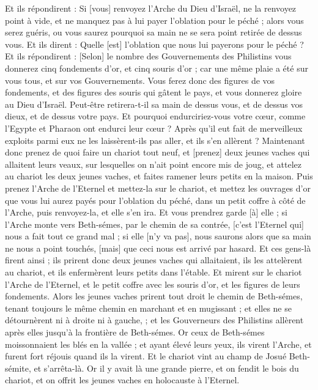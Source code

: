 \begin{multicols}{2}
Et ils répondirent : Si [vous] renvoyez l'Arche du Dieu d'Israël, ne la renvoyez point à vide, et ne manquez pas à lui payer l'oblation pour le péché ; alors vous serez guéris, ou vous saurez pourquoi sa main ne se sera point retirée de dessus vous.
Et ils dirent : Quelle [est] l'oblation que nous lui payerons pour le péché ? Et ils répondirent : [Selon] le nombre des Gouvernements des Philistins vous donnerez cinq fondements d'or, et cinq souris d'or ; car une même plaie a été sur vous tous, et sur vos Gouvernements.
Vous ferez donc des figures de vos fondements, et des figures des souris qui gâtent le pays, et vous donnerez gloire au Dieu d'Israël. Peut-être retirera-t-il sa main de dessus vous, et de dessus vos dieux, et de dessus votre pays.
Et pourquoi endurciriez-vous votre cœur, comme l'Egypte et Pharaon ont endurci leur cœur ? Après qu'il eut fait de merveilleux exploits parmi eux ne les laissèrent-ils pas aller, et ils s'en allèrent ?
Maintenant donc prenez de quoi faire un chariot tout neuf, et [prenez] deux jeunes vaches qui allaitent leurs veaux, sur lesquelles on n'ait point encore mis de joug, et attelez au chariot les deux jeunes vaches, et faites ramener leurs petits en la maison.
Puis prenez l'Arche de l'Eternel et mettez-la sur le chariot, et mettez les ouvrages d'or que vous lui aurez payés pour l'oblation du péché, dans un petit coffre à côté de l'Arche, puis renvoyez-la, et elle s'en ira.
Et vous prendrez garde [à] elle ; si l'Arche monte vers Beth-sémes, par le chemin de sa contrée, [c'est l'Eternel qui] nous a fait tout ce grand mal ; si elle [n'y va pas], nous saurons alors que sa main ne nous a point touchés, [mais] que ceci nous est arrivé par hasard.
Et ces gens-là firent ainsi ; ils prirent donc deux jeunes vaches qui allaitaient, ils les attelèrent au chariot, et ils enfermèrent leurs petits dans l'étable.
Et mirent sur le chariot l'Arche de l'Eternel, et le petit coffre avec les souris d'or, et les figures de leurs fondements.
Alors les jeunes vaches prirent tout droit le chemin de Beth-sémes, tenant toujours le même chemin en marchant et en mugissant ; et elles ne se détournèrent ni à droite ni à gauche, ; et les Gouverneurs des Philistins allèrent après elles jusqu'à la frontière de Beth-sémes.
Or ceux de Beth-sémes moissonnaient les blés en la vallée ; et ayant élevé leurs yeux, ils virent l'Arche, et furent fort réjouis quand ils la virent.
Et le chariot vint au champ de Josué Beth-sémite, et s'arrêta-là. Or il y avait là une grande pierre, et on fendit le bois du chariot, et on offrit les jeunes vaches en holocauste à l'Eternel.

\end{multicols}
